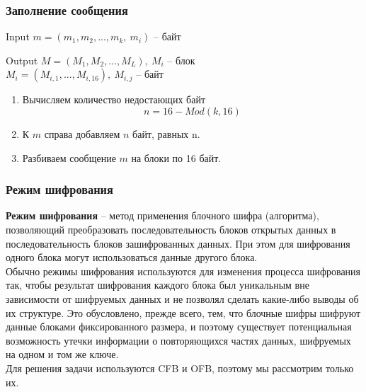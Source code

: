 \documentclass[10pt, typeface=serif(roman), pdf,hyperref={unicode}, aspectratio=169]{beamer}
\begin{document}
\begin{frame}
	\frametitle{Заполнение сообщения}
	\begin{block}
		{
			Input
		}
		\(m = (m_1,m_2,...,m_k, ~m_i)\) -- байт
	\end{block}
	\begin{block}
		{
			Output
		}
		\(M = (M_1,M_2,...,M_L), ~M_{i}\) -- блок\\
		\(M_i = (M_{i,1},...,M_{i,16}), ~M_{i,j}\) -- байт
	\end{block}
	\begin{enumerate}
		\item Вычисляем количество недостающих байт
		\[n = 16 - Mod(k,16)\]
		\item К \(m\) справа добавляем \(n\) байт, равных n.
		\item Разбиваем сообщение \(m\) на блоки по 16 байт.
	\end{enumerate}
\end{frame}



\begin{frame}
	\frametitle{Режим шифрования}
	\textbf{Режим шифрования} -- метод применения блочного шифра (алгоритма), позволяющий преобразовать последовательность блоков открытых данных в последовательность блоков зашифрованных данных. При этом для шифрования одного блока могут использоваться данные другого блока.\\
	Обычно режимы шифрования используются для изменения процесса шифрования так, чтобы результат шифрования каждого блока был уникальным вне зависимости от шифруемых данных и не позволял сделать какие-либо выводы об их структуре. Это обусловлено, прежде всего, тем, что блочные шифры шифруют данные блоками фиксированного размера, и поэтому существует потенциальная возможность утечки информации о повторяющихся частях данных, шифруемых на одном и том же ключе. \\
	Для решения задачи используются CFB и OFB, поэтому мы рассмотрим только их.
\end{frame}
\end{document}
